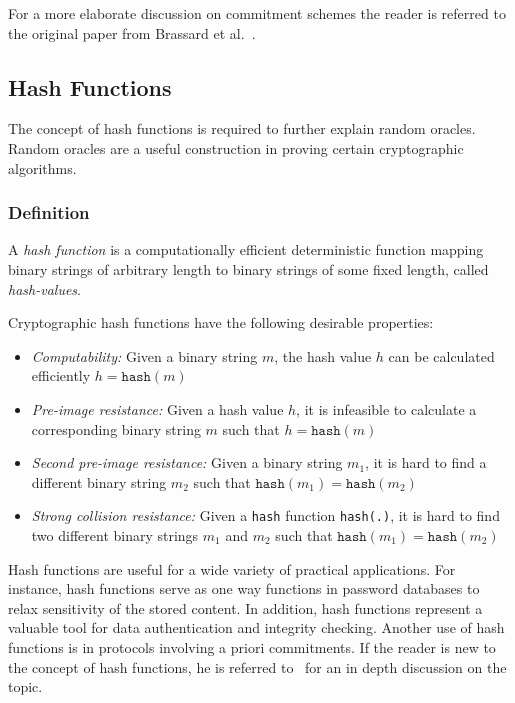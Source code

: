 For a more elaborate discussion on commitment schemes the reader is referred to the original paper from Brassard et al.~\cite{art:BrassardCC88}.

\subsection{Hash Functions}
The concept of hash functions is required to further explain random oracles. Random oracles are a useful construction in proving certain cryptographic algorithms.

\label{sec:hash_functions}
\subsubsection{Definition}
A \textit{hash function} is a computationally efficient deterministic function mapping binary strings of arbitrary length to binary strings of some fixed length, called \textit{hash-values}.

Cryptographic hash functions have the following desirable properties:
\begin{itemize}
 \item \textit{Computability:} Given a binary string $m$, the hash value $h$ can be calculated efficiently $h = \texttt{hash} \left( m \right)$
 \item \textit{Pre-image resistance:} Given a hash value $h$, it is infeasible to calculate a corresponding binary string $m$ such that $h = \texttt{hash} \left( m \right)$
 \item \textit{Second pre-image resistance:} Given a binary string $m_1$, it is hard to find a different binary string $m_2$ such that $\texttt{hash} \left( m_1 \right) = \texttt{hash} \left( m_2 \right)$
 \item \textit{Strong collision resistance:} Given a \texttt{hash} function \texttt{hash(.)}, it is hard to find two different binary strings $m_1$ and $m_2$ such that $\texttt{hash} \left( m_1 \right) = \texttt{hash} \left( m_2 \right)$
\end{itemize}

Hash functions are useful for a wide variety of practical applications. For instance, hash functions serve as one way functions in password databases to relax sensitivity of the stored content. In addition, hash functions represent a valuable tool for data authentication and integrity checking. Another use of hash functions is in protocols involving a priori commitments. If the reader is new to the concept of hash functions, he is referred to~\cite{book:handbook_of_applied_cryptography} for an in depth discussion on the topic.

